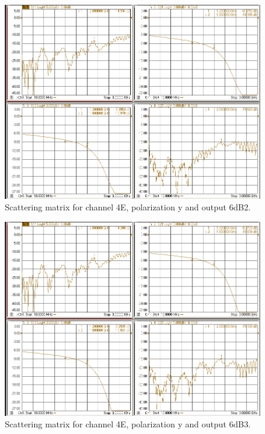 \documentclass[12pt,a4paper,oneside]{article}
\begin{document}
\begin{figure}[H]
\centering
\includegraphics[width=0.9\linewidth]{VNA_results/4Ey_6dB2.png}
\caption{Scattering matrix for channel 4E, polarization y and output 6dB2.}
\label{fig:4Ey_6dB2}
\end{figure}


\begin{figure}[H]
\centering
\includegraphics[width=0.9\linewidth]{VNA_results/4Ey_6dB3.png}
\caption{Scattering matrix for channel 4E, polarization y and output 6dB3.}
\label{fig:4Ey_6dB3}
\end{figure}
\end{document}
